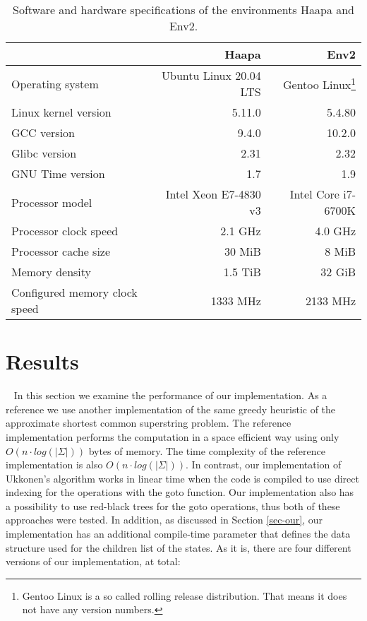 \documentclass[english,twoside,censored,csm,algorithms-track-2020]{HYthesisML}
\theoremstyle{plain}
\theoremstyle{definition}
\begin{document}
\begin{table}
\begin{tabular}{l|r|r}
  & \textbf{Haapa} & \textbf{Env2} \\
  \hline
  Operating system & Ubuntu Linux 20.04 LTS & Gentoo Linux\footnote{Gentoo Linux is a so called rolling release distribution. That means it does not have any version numbers.} \\
  Linux kernel version & 5.11.0 & 5.4.80 \\
  GCC version & 9.4.0 & 10.2.0 \\
  Glibc version & 2.31 & 2.32 \\
  GNU Time version & 1.7 & 1.9 \\
  \hline
  Processor model & Intel Xeon E7-4830 v3 & Intel Core i7-6700K \\
  Processor clock speed & 2.1 GHz & 4.0 GHz \\
  Processor cache size & 30 MiB & 8 MiB \\
  Memory density & 1.5 TiB & 32 GiB \\
  Configured memory clock speed & 1333 MHz & 2133 MHz \\
\end{tabular}
\caption{Software and hardware specifications of the environments Haapa and Env2.}
\label{tbl-sys}
\end{table}



\section{Results}~\label{sec-results}
In this section we examine the performance of our implementation. As a reference we use another
implementation of the same greedy heuristic of the approximate shortest common superstring problem.
The reference implementation \citep{Alanko19} performs the computation in a space efficient way using
only $O(n \cdot log(|\Sigma|))$ bytes of memory. The time complexity of the reference implementation
is also $O(n \cdot log(|\Sigma|))$. In contrast, our implementation of Ukkonen's algorithm
works in linear time when the code is compiled to use direct indexing for the operations with
the goto function. Our implementation also has a possibility to use red-black trees for the goto
operations, thus both of these approaches were tested.
In addition, as discussed in Section
\ref{sec-our}, our implementation has an additional compile-time parameter that defines the data
structure used for the children list of the states. As it is, there are four different versions of
our implementation, at total:
\end{document}
